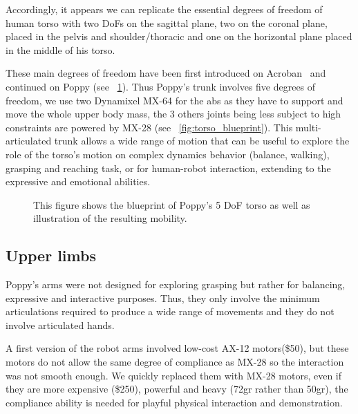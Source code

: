 Accordingly, it appears we can replicate the essential degrees of freedom of human torso with two DoFs on the sagittal plane, two on the coronal plane, placed in the pelvis and shoulder/thoracic and one on the horizontal plane placed in the middle of his torso.

These main degrees of freedom have been first introduced on Acroban~\parencite{ly2011bio} and continued on Poppy (see \figurename~\ref{fig:poppy_torso}).
Thus Poppy's trunk involves five degrees of freedom, we use two Dynamixel MX-64 for the abs as they have to support and move the whole upper body mass, the 3 others joints being less subject to high constraints are powered by MX-28 (see \figurename~\ref{fig:torso_blueprint}). This multi-articulated trunk allows a wide range of motion that can be useful to explore the role of the torso’s motion on complex dynamics behavior (balance, walking), grasping and reaching task, or for human-robot interaction, extending to the expressive and emotional abilities.

\begin{figure}[p]
\centering


    \hfill
    \caption{This figure shows the blueprint of Poppy's 5 DoF torso as well as illustration of the resulting mobility.}
    \label{fig:poppy_torso}
\end{figure}



\subsection{Upper limbs} %

Poppy's arms were not designed for exploring grasping but rather for balancing, expressive and interactive purposes. Thus, they only involve the minimum articulations required to produce a wide range of movements and they do not involve articulated hands.

A first version of the robot arms involved low-cost AX-12 motors(\$50), but these motors do not allow the same degree of compliance as MX-28 so the interaction was not smooth enough. We quickly replaced them with MX-28 motors, even if they are more expensive (\$250), powerful and heavy (72gr rather than 50gr), the compliance ability is needed for playful physical interaction and demonstration.

